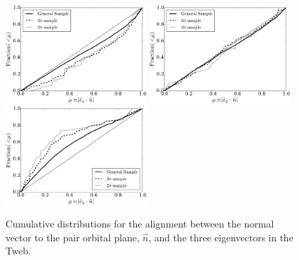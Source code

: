 \documentclass{emulateapj}
\begin{document}
\begin{figure}
\begin{center}
  \includegraphics[width=0.48\textwidth]{alignments_e1_n_all_environments.pdf} 
  \includegraphics[width=0.48\textwidth]{alignments_e2_n_all_environments.pdf} 
  \includegraphics[width=0.48\textwidth]{alignments_e3_n_all_environments.pdf} 
\end{center}
\caption{Cumulative distributions for the alignment between the normal
  vector to the pair orbital plane, $\hat{n}$, and the three eigenvectors in
  the Tweb.
    \label{fig:alignment_n}}  
\end{figure}
\end{document}
